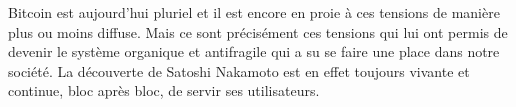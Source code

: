 Bitcoin est aujourd'hui pluriel et il est encore en proie à ces tensions de manière plus ou moins diffuse. Mais ce sont précisément ces tensions qui lui ont permis de devenir le système organique et antifragile qui a su se faire une place dans notre société. La découverte de Satoshi Nakamoto est en effet toujours vivante et continue, bloc après bloc, de servir ses utilisateurs.